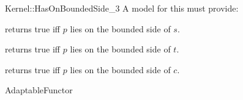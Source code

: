 \begin{ccRefFunctionObjectConcept}{Kernel::HasOnBoundedSide_3}
A model for this must provide:


{returns true iff $p$ lies on the bounded side of $s$.}

{returns true iff $p$ lies on the bounded side of $t$.}

{returns true iff $p$ lies on the bounded side of $c$.}

\ccRefines
AdaptableFunctor

\ccSeeAlso
{}  \\
 \\
 \\


\end{ccRefFunctionObjectConcept}
